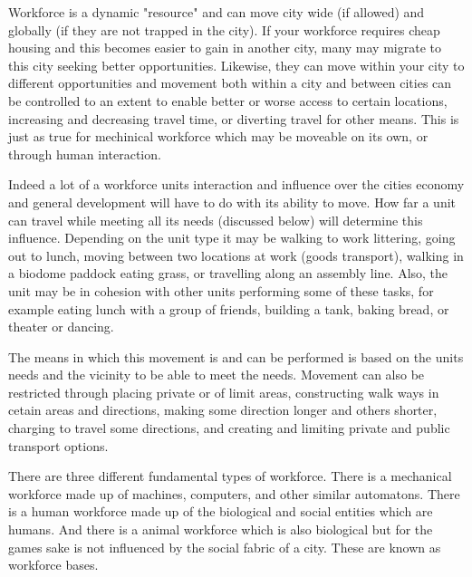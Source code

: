 Workforce is a dynamic "resource" and can move city wide (if allowed) and globally (if they are not trapped in the city). If your workforce requires cheap housing and this becomes easier to gain in another city, many may migrate to this city seeking better opportunities. Likewise, they can move within your city to different opportunities and movement both within a city and between cities can be controlled to an extent to enable better or worse access to certain locations, increasing and decreasing travel time, or diverting travel for other means. This is just as true for mechinical workforce which may be moveable on its own, or through human interaction. 

Indeed a lot of a workforce units interaction and influence over the cities economy and general development will have to do with its ability to move. How far a unit can travel while meeting all its needs (discussed below) will determine this influence. Depending on the unit type it may be walking to work littering, going out to lunch, moving between two locations at work (goods transport), walking in a biodome paddock eating grass, or travelling along an assembly line. Also, the unit may be in cohesion with other units performing some of these tasks, for example eating lunch with a group of friends, building a tank, baking bread, or theater or dancing. 

The means in which this movement is and can be performed is based on the units needs and the vicinity to be able to meet the needs. Movement can also be restricted through placing private or of limit areas, constructing walk ways in cetain areas and directions, making some direction longer and others shorter, charging to travel some directions, and creating and limiting private and public transport options. 


There are three different fundamental types of workforce. There is a mechanical workforce made up of machines, computers, and other similar automatons. There is a human workforce made up of the biological and social entities which are humans. And there is a animal workforce which is also biological but for the games sake is not influenced by the social fabric of a city. These are known as workforce bases. 

